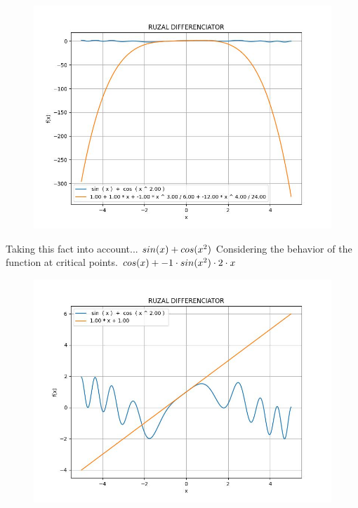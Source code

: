 \documentclass[a4paper, 12pt]{article}
\begin{document}
\newpage
\begin{figure} [!ht]
\begin{flushleft}
\includegraphics[scale = 0.700000]{taylor.jpeg}
\end{flushleft}
\end{figure}
Taking this fact into account...\newline
$ sin( x )  +  cos(  { x } ^ {\small 2 }  ) $\newline
Considering the behavior of the function at critical points.\newline
$ cos( x )  + -1 \cdot  sin(  { x } ^ {\small 2 }  )  \cdot 2 \cdot x$\newline
\newpage
\begin{figure} [!ht]
\begin{flushleft}
\includegraphics[scale = 0.700000]{tangent.jpeg}
\end{flushleft}
\end{figure}
\end{document}
